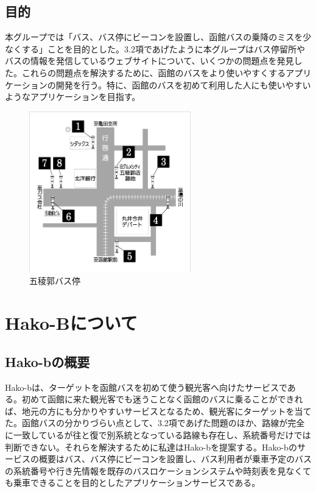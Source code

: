 \documentclass[openany,11pt,papersize]{jsbook}
\begin{document}

\section{目的}\label{sec:gaiyou}
本グループでは「バス、バス停にビーコンを設置し、函館バスの乗降のミスを少なくする」ことを目的とした。3.2項であげたように本グループはバス停留所やバスの情報を発信しているウェブサイトについて、いくつかの問題点を発見した。これらの問題点を解決するために、函館のバスをより使いやすくするアプリケーションの開発を行う。特に、函館のバスを初めて利用した人にも使いやすいようなアプリケーションを目指す。


\begin{figure}[htbp]
  \begin{center}
    \includegraphics[clip,width=7.0cm]{img/14007.jpg}
    \caption{五稜郭バス停}
    \label{fig:goryo}
  \end{center}
\end{figure}

\chapter{Hako-Bについて}

\section{Hako-bの概要}
Hako-bは、ターゲットを函館バスを初めて使う観光客へ向けたサービスである。初めて函館に来た観光客でも迷うことなく函館のバスに乗ることができれば、地元の方にも分かりやすいサービスとなるため、観光客にターゲットを当てた。函館バスの分かりづらい点として、3.2項であげた問題のほか、路線が完全に一致しているが往と復で別系統となっている路線も存在し、系統番号だけでは判断できない。それらを解決するために私達はHako-bを提案する。Hako-bのサービスの概要はバス、バス停にビーコンを設置し、バス利用者が乗車予定のバスの系統番号や行き先情報を既存のバスロケーションシステムや時刻表を見なくても乗車できることを目的としたアプリケーションサービスである。
\end{document}
